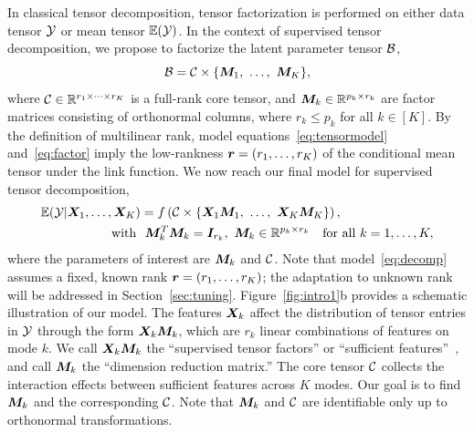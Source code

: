 \documentclass[12pt]{article}
\theoremstyle{definition}
\theoremstyle{definition}
\begin{document}
In classical tensor decomposition, tensor factorization is performed on either data tensor $\mathcal{Y}$ or mean tensor $\mathbb{E}(\mathcal{Y})$. In the context of supervised tensor decomposition, we propose to factorize the latent parameter tensor $\mathcal{B}$,
\begin{equation}\label{eq:factor}
\mathcal{B}=\mathcal{C}\times\{\bm M_1,\ \ldots,\ \bm M_K\},
\end{equation}
where $\mathcal{C}\in\mathbb{R}^{r_1\times \cdots \times r_K}$ is a full-rank core tensor, and $\bm M_k\in\mathbb{R}^{p_k\times r_k}$ are factor matrices consisting of orthonormal columns, where $r_k\leq p_k$ for all $k\in[K]$. By the definition of multilinear rank, model equations~\eqref{eq:tensormodel} and~\eqref{eq:factor} imply the low-rankness $\bm{r}=(r_1,\ldots,r_K)$ of the conditional mean tensor under the link function. We now reach our final model for supervised tensor decomposition,
\begin{align}\label{eq:decomp}
\mathbb{E}(\tY|\mX_1,\ldots,\mX_K) &= f\left(\tC\times\{\mX_1\mM_1,\ \ldots,\ \mX_K\mM_K\}\right),\notag\\
\text{with} \ &\ \mM_k^T\mM_k = \mI_{r_k},\ \mM_k\in\mathbb{R}^{p_k\times r_k}\quad \text{for all }k=1,\ldots,K,
\end{align}
where the parameters of interest are $\bm M_k$ and $\mathcal{C}$. Note that model~\eqref{eq:decomp} assumes a fixed, known rank $\bm{r}=(r_1,\ldots,r_K)$; the adaptation to unknown rank will be addressed in Section~\ref{sec:tuning}. Figure~\ref{fig:intro1}b provides a schematic illustration of our model. The features $\bm X_k$ affect the distribution of tensor entries in $\mathcal{Y}$ through the form $\bm X_k\bm M_k$, which are $r_k$ linear combinations of features on mode $k$. We call $\bm X_k\bm M_k$ the ``supervised tensor factors'' or ``sufficient features''~\citep{adragni2009sufficient}, and call $\bm M_k$ the ``dimension reduction matrix.'' The core tensor $\mathcal{C}$ collects the interaction effects between sufficient features across $K$ modes. Our goal is to find $\bm M_k$ and the corresponding $\mathcal{C}$. Note that $\bm M_k$ and $\mathcal{C}$ are identifiable only up to orthonormal transformations.  
\end{document}
